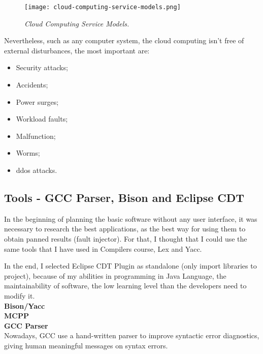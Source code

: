 \begin{figure}[!ht]
\begin{center}
\texttt{[image: cloud-computing-service-models.png]}
\caption{\small \sl Cloud Computing Service Models.\label{fig:cloudcomputingservicemodels}}
\end{center}
\end{figure}

Nevertheless, such as any computer system, the cloud computing isn't free of external disturbances\cite{wolter2012resilience}, the most important are:
\begin{itemize}
 	\item Security attacks;
 	\item Accidents;
 	\item Power surges;
 	\item Workload faults;
 	\item Malfunction;
 	\item Worms;
 	\item \acl{ddos} attacks.
 \end{itemize}

\clearpage
\subsection{Tools - GCC Parser, Bison and Eclipse CDT}

In the beginning of planning the basic software without any user interface, it was necessary to research the best applications, as the best way for using them to obtain panned results (fault injector).
For that, I thought that I could use the same tools that I have used in Compilers course, Lex and Yacc.


In the end, I selected Eclipse CDT Plugin as standalone (only import libraries to project), because of my abilities in programming in Java Language, the maintainability of software, the low learning level than the developers need to modify it.\\

\textbf{Bison/Yacc}\\

\textbf{MCPP}\\

\textbf{GCC Parser}\\

Nowadays, GCC use a hand-written parser to improve syntactic error diagnostics, giving human meaningful messages on syntax errors.\\

